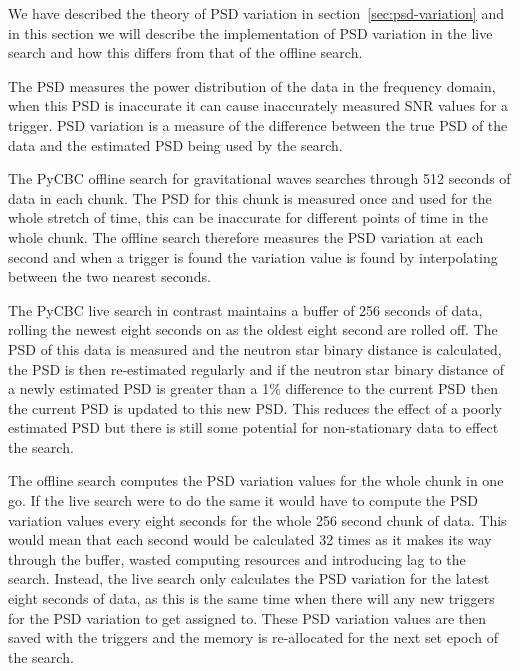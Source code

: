 We have described the theory of PSD variation in section~\ref{sec:psd-variation} and in this section we will describe the implementation of PSD variation in the live search and how this differs from that of the offline search.

The PSD measures the power distribution of the data in the frequency domain, when this PSD is inaccurate it can cause inaccurately measured SNR values for a trigger. PSD variation is a measure of the difference between the true PSD of the data and the estimated PSD being used by the search.

The PyCBC offline search for gravitational waves searches through 512 seconds of data in each chunk. The PSD for this chunk is measured once and used for the whole stretch of time, this can be inaccurate for different points of time in the whole chunk. The offline search therefore measures the PSD variation at each second and when a trigger is found the variation value is found by interpolating between the two nearest seconds.

The PyCBC live search in contrast maintains a buffer of 256 seconds of data, rolling the newest eight seconds on as the oldest eight second are rolled off. The PSD of this data is measured and the neutron star binary distance is calculated, the PSD is then re-estimated regularly and if the neutron star binary distance of a newly estimated PSD is greater than a 1\% difference to the current PSD then the current PSD is updated to this new PSD. This reduces the effect of a poorly estimated PSD but there is still some potential for non-stationary data to effect the search. 

The offline search computes the PSD variation values for the whole chunk in one go. If the live search were to do the same it would have to compute the PSD variation values every eight seconds for the whole 256 second chunk of data. This would mean that each second would be calculated 32 times as it makes its way through the buffer, wasted computing resources and introducing lag to the search. Instead, the live search only calculates the PSD variation for the latest eight seconds of data, as this is the same time when there will any new triggers for the PSD variation to get assigned to. These PSD variation values are then saved with the triggers and the memory is re-allocated for the next set epoch of the search.

